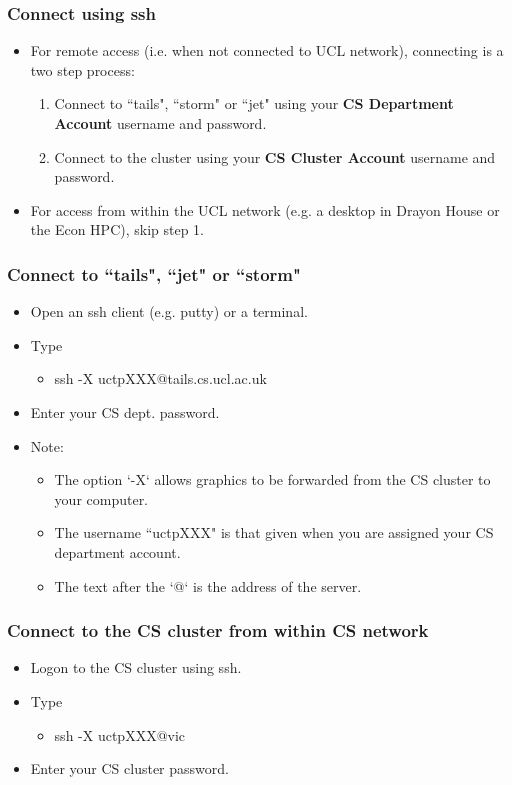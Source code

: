 \documentclass{beamer}
\begin{document}
\begin{frame}
\frametitle{Connect using ssh}
\begin{itemize}
\item For remote access (i.e. when not connected to UCL network), connecting is a two step process:
\begin{enumerate}
\item Connect to ``tails", ``storm" or ``jet" using your \textbf{CS Department Account} username and password.
\item Connect to the cluster using your \textbf{CS Cluster Account} username and password.
\end{enumerate}
\item For access from within the UCL network (e.g. a desktop in Drayon House or the Econ HPC), skip step 1.
\end{itemize}
\end{frame}

\begin{frame}
\frametitle{Connect to ``tails", ``jet" or ``storm"}
\begin{itemize}
\item Open an ssh client (e.g. putty) or a terminal.
\item Type
\begin{itemize}
\item ssh -X uctpXXX@tails.cs.ucl.ac.uk
\end{itemize} 
\item Enter your CS dept. password.
\item Note:
\begin{itemize}
\item The option `-X` allows graphics to be forwarded from the CS cluster to your computer.
\item The username ``uctpXXX" is that given when you are assigned your CS department account.
\item The text after the `@` is the address of the server.
\end{itemize}
\end{itemize}
\end{frame}

\begin{frame}
\frametitle{Connect to the CS cluster from within CS network}
\begin{itemize}
\item Logon to the CS cluster using ssh.
\item Type 
\begin{itemize}
\item ssh -X uctpXXX@vic
\end{itemize}
\item Enter your CS cluster password.
\end{itemize}
\end{frame}
\end{document}
